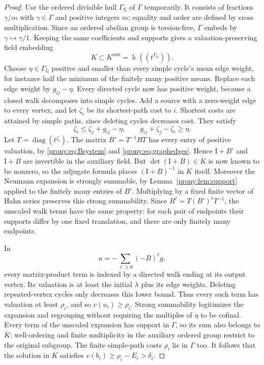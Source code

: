 \documentclass[11pt,letterpaper]{article}
\theoremstyle{definition}
\theoremstyle{remark}
\newcommand{\Q}{\mathbb Q}
\newcommand{\Id}{\mathrm I}
\DeclareMathOperator{\diag}{diag}
\begin{document}
\begin{proof}
Use the ordered divisible hull $\Gamma_{\Q}$ of $\Gamma$ temporarily.
It consists of fractions $\gamma/m$ with $\gamma\in\Gamma$ and positive
integers $m$; equality and order are defined by cross multiplication.
Since an ordered abelian group is torsion-free, $\Gamma$ embeds by
$\gamma\mapsto\gamma/1$. Keeping the same coefficients and supports gives
a valuation-preserving field embedding
\[
 K\subset K^{\mathrm{aux}}=\Bbbk((t^{\Gamma_{\Q}})).
\]
Choose $\eta\in\Gamma_{\Q}$ positive and smaller than every simple cycle's
mean edge weight, for instance half the minimum of the finitely many
positive means. Replace each edge weight by $g_{ij}-\eta$. Every directed
cycle now has positive weight, because a closed walk decomposes into simple
cycles. Add a source with a zero-weight edge to every vertex, and let
$\zeta_i$ be its shortest-path cost to $i$. Shortest costs are attained
by simple paths, since deleting cycles decreases cost. They satisfy
\[
 \zeta_i\le\zeta_j+g_{ij}-\eta,
 \qquad g_{ij}+\zeta_j-\zeta_i\ge\eta.
\]
Let $T=\diag(t^{\zeta_i})$. The matrix
$B'=T^{-1}BT$ has every entry of positive valuation, by
\eqref{prony:eq:Bsystem} and \eqref{prony:eq:graphedges}. Hence $\Id+B'$ and $\Id+B$ are invertible in the auxiliary field.
But $\det(\Id+B)\in K$ is now known to be nonzero, so the adjugate formula
places $(\Id+B)^{-1}$ in $K$ itself. Moreover the Neumann expansion is strongly summable,
by Lemma~\ref{prony:lem:support} applied to the finitely many entries of $B'$.
Multiplying by a fixed finite vector of Hahn series preserves this strong
summability. Since $B^\ell=T(B')^\ell T^{-1}$, the unscaled walk terms
have the same property: for each pair of endpoints their supports differ
by one fixed translation, and there are only finitely many endpoints.

In
\[
 u=-\sum_{\ell\ge0}(-B)^\ell g,
\]
every matrix-product term is indexed by a directed walk ending at its
output vertex. Its valuation is at least the initial $\lambda$ plus its
edge weights. Deleting repeated-vertex cycles only decreases this lower
bound. Thus every such term has valuation at least $\rho_i$, and so
$v(u_i)\ge\rho_i$. Strong summability legitimizes the expansion and
regrouping without requiring the multiples of $\eta$ to be cofinal.
Every term of the unscaled expansion has support in $\Gamma$, so its
sum also belongs to $K$: well-ordering and finite multiplicity in the
auxiliary ordered group restrict to the original subgroup. The finite
simple-path costs $\rho_i$ lie in $\Gamma$ too. It follows that the solution
in $K$ satisfies $v(b_i)\ge\rho_i-E_i>\delta_i$.


\end{proof}
\end{document}
